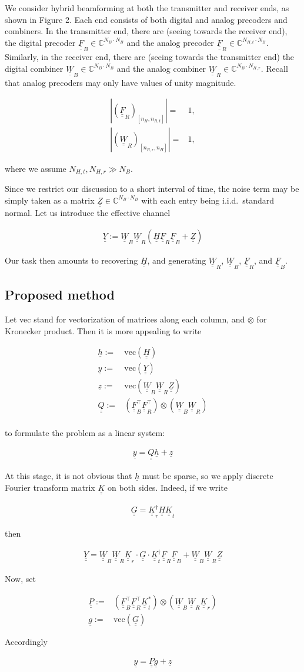 \documentclass[journal]{IEEEtran}
\newcommand {\D} {\cdot}
\newcommand {\Tr} {\intercal}
\newcommand {\m} [1] {\( #1 \)}
\newcommand {\V} [1] {\underline {#1}}
\newcommand {\M} [1] {\underline {\underline {#1}}}
\newcommand {\RB} [1] {\left( #1 \right)}
\newcommand {\SB} [1] {\left[ #1 \right]}
\newcommand {\Nm} [1] {\left \vert #1 \right \vert}
\newcommand {\Disp} [1] {
   \begin {align*}
      #1
   \end {align*}
}
\begin{document}
We consider hybrid beamforming at both the transmitter and receiver ends, as shown in Figure 2.
Each end consists of both digital and analog precoders and combiners.
In the transmitter end, there are (seeing towards the receiver end), the digital precoder \m {\M {F} _B \in \mathbb {C} ^{N_B \D N_B}} and the analog precoder \m {\M {F} _R \in \mathbb {C} ^{N_{H,t} \D N_B}}.
Similarly, in the receiver end, there are (seeing towards the transmitter end) the digital combiner \m {\M {W} _B \in \mathbb {C} ^{N_B \D N_B}} and the analog combiner \m {\M {W} _R \in \mathbb {C} ^{N_B \D N_{H,r}}}.
Recall that analog precoders may only have values of unity magnitude.
\Disp {
\Nm {\RB {\M {F} _R} _{\SB {n_H, n_{R,t}}}}
= &1, \\
\Nm {\RB {\M {W} _R} _{\SB {n_{R,r}, n_H}}}
= &1,
}
where we assume \m {N_{H,t}, N_{H,r} \gg N_B}.

Since we restrict our discussion to a short interval of time, the noise term may be simply taken as a matrix \m {\M {Z} \in \mathbb {C} ^{N_B \D N_B}} with each entry being i.i.d.\ standard normal.
Let us introduce the effective channel
\Disp {
\M {Y}
:=\M {W} _B \M {W} _R \RB {\M {H} \M {F} _R \M {F} _B +\M {Z}} 
}
Our task then amounts to recovering \m {\M {H}}, and generating \m {\M {W} _R}, \m {\M {W} _B}, \m {\M {F} _R}, and \m {\M {F} _B}.

\subsection{Proposed method}

Let vec stand for vectorization of matrices along each column, and \m {\otimes} for Kronecker product.
Then it is more appealing to write
\Disp {
\V {h}
:= &\mathrm {vec} \RB {\M {H}} \\
\V {y}
:= &\mathrm {vec} \RB {\M {Y}} \\
\V {z}
:= &\mathrm {vec} \RB {\M {W} _B \M {W} _R \M {Z}} \\
\M {Q}
:= &\RB {\M {F} _B^\intercal \M {F} _R^\Tr} \otimes \RB {\M {W} _B \M {W} _R} \\
}
to formulate the problem as a linear system:
\Disp {
\V {y}
=\M {Q} \V {h} +\V {z} 
}

At this stage, it is not obvious that \m {\V {h}} must be sparse, so we apply discrete Fourier transform matrix \m {\M {K}} on both sides.
Indeed, if we write
\Disp {
\M {G}
=\M {K}^\dagger _r \M {H} \M {K} _t
}
then
\Disp {
\M {Y}
=\M {W} _B \M {W} _R \M {K} _r \D \M {G} \D \M {K}^\dagger _t \M {F} _R \M {F} _B
+\M {W} _B \M {W} _R \M {Z}
}
Now, set
\Disp {
\M {P}
:= &\RB {\M {F} _B^\intercal \M {F} _R^\intercal \M {K}^\ast _t} \otimes \RB {\M {W} _B \M {W} _R \M {K} _r} \\
\V {g}
:= &\mathrm {vec} \RB {\M {G}}
}
Accordingly
\Disp {
\V {y}
=\M {P} \V {g} +\V {z} 
}
\end{document}
